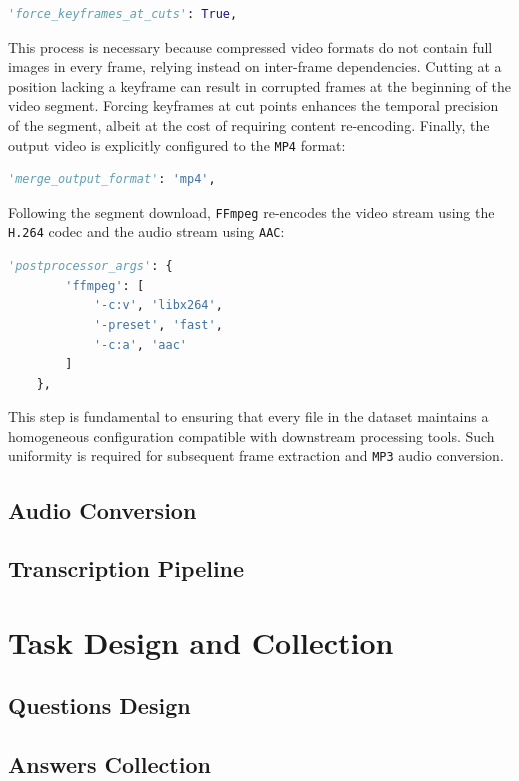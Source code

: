 \begin{lstlisting}[language=Python]
    'force_keyframes_at_cuts': True,
\end{lstlisting}
This process is necessary because compressed video formats do not contain full images in every frame, relying instead on inter-frame dependencies. Cutting at a position lacking a keyframe can result in corrupted frames at the beginning of the video segment. Forcing keyframes at cut points enhances the temporal precision of the segment, albeit at the cost of requiring content re-encoding.
Finally, the output video is explicitly configured to the \texttt{MP4} format:
\begin{lstlisting}[language=Python]
    'merge_output_format': 'mp4',
\end{lstlisting}
Following the segment download, \texttt{FFmpeg} re-encodes the video stream using the \texttt{H.264} codec and the audio stream using \texttt{AAC}:
\begin{lstlisting}[language=Python]
    'postprocessor_args': {
        'ffmpeg': [
            '-c:v', 'libx264',
            '-preset', 'fast',
            '-c:a', 'aac'
        ]
    },
\end{lstlisting}
This step is fundamental to ensuring that every file in the dataset maintains a homogeneous configuration compatible with downstream processing tools. Such uniformity is required for subsequent frame extraction and \texttt{MP3} audio conversion.



\subsection{Audio Conversion}
\subsection{Transcription Pipeline}
\section{Task Design and Collection}
\subsection{Questions Design}
\label{subsec:questions}
\subsection{Answers Collection}
